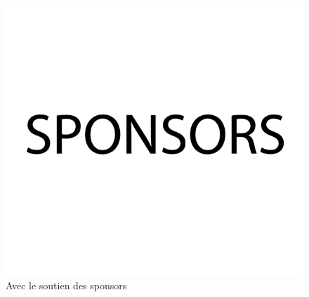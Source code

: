 \documentclass[a4paper,10pt]{article}
\begin{document}
\begin{figure}[b]
\begin{center}
\caption*{\small Avec le soutien des sponsors}
\includegraphics[scale=0.2]{facture-banlieues-sponsors.png}
\end{center}
\end{figure}
\end{document}

